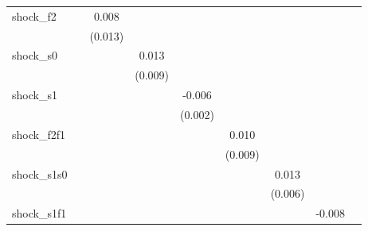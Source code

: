 {\begin{tabular}{l*{8}{c}}
\addlinespace
shock\_f2    &                     &       0.008         &                     &                     &                     &                     &                     &                     \\
            &                     &     (0.013)         &                     &                     &                     &                     &                     &                     \\
\addlinespace
shock\_s0    &                     &                     &       0.013         &                     &                     &                     &                     &                     \\
            &                     &                     &     (0.009)         &                     &                     &                     &                     &                     \\
\addlinespace
shock\_s1    &                     &                     &                     &      -0.006\sym{***}&                     &                     &                     &                     \\
            &                     &                     &                     &     (0.002)         &                     &                     &                     &                     \\
\addlinespace
shock\_f2f1  &                     &                     &                     &                     &       0.010         &                     &                     &                     \\
            &                     &                     &                     &                     &     (0.009)         &                     &                     &                     \\
\addlinespace
shock\_s1s0  &                     &                     &                     &                     &                     &       0.013\sym{**} &                     &                     \\
            &                     &                     &                     &                     &                     &     (0.006)         &                     &                     \\
\addlinespace
shock\_s1f1  &                     &                     &                     &                     &                     &                     &      -0.008         &                     \\

\end{tabular}}
